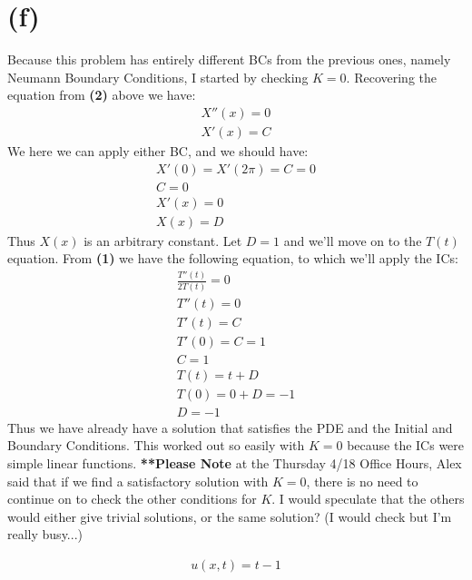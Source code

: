 \documentclass{article}
\begin{document}
\section*{\textbf{(f)}}
Because this problem has entirely different BCs from the previous ones, namely Neumann Boundary Conditions, I started by checking $K=0$. Recovering the equation from \textbf{(2)} above we have:
\begin{equation}
\begin{aligned}
X''(x) = 0\\
X'(x) = C
\end{aligned}
\end{equation}
We here we can apply either BC, and we should have:
\begin{equation}
\begin{aligned}
X'(0) = X'(2\pi) = C = 0\\
C = 0\\
X'(x) = 0\\
X(x) = D
\end{aligned}
\end{equation}
Thus $X(x)$ is an arbitrary constant. Let $D=1$ and we'll move on to the $T(t)$ equation. From \textbf{(1)} we have the following equation, to which we'll apply the ICs:
\begin{equation}
\begin{aligned}
\frac{T''(t)}{2T(t)} = 0\\
T''(t) = 0\\
T'(t) = C\\
T'(0) = C = 1\\
C = 1\\
T(t) = t + D\\
T(0) = 0 + D = -1\\
D = -1
\end{aligned}
\end{equation}
Thus we have already have a solution that satisfies the PDE and the Initial and Boundary Conditions. This worked out so easily with $K=0$ because the ICs were simple linear functions. \textbf{**Please Note} at the Thursday 4/18 Office Hours, Alex said that if we find a satisfactory solution with $K=0$, there is no need to continue on to check the other conditions for $K$. I would speculate that the others would either give trivial solutions, or the same solution? (I would check but I'm really busy...)
\begin{tcolorbox}[minipage,colback=white,arc=0pt,outer arc=0pt]
\begin{equation}
\begin{aligned}
u(x,t) = t - 1
\end{aligned}
\end{equation}
\end{tcolorbox}
\end{document}
